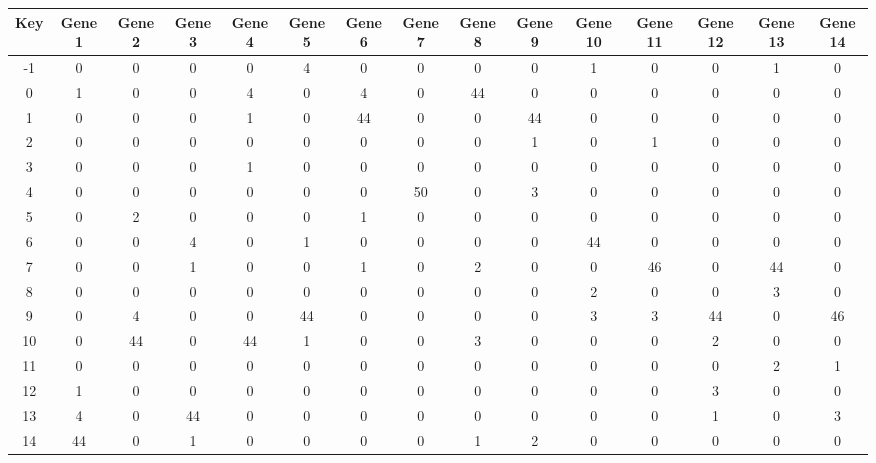 \begin{tabular}{|c|c|c|c|c|c|c|c|c|c|c|c|c|c|c|}
\hline
Key & Gene 1 & Gene 2 & Gene 3 & Gene 4 & Gene 5 & Gene 6 & Gene 7 & Gene 8 & Gene 9 & Gene 10 & Gene 11 & Gene 12 & Gene 13 & Gene 14 \\
\hline
-1 & 0 & 0 & 0 & 0 & 4 & 0 & 0 & 0 & 0 & 1 & 0 & 0 & 1 & 0 \\
0 & 1 & 0 & 0 & 4 & 0 & 4 & 0 & 44 & 0 & 0 & 0 & 0 & 0 & 0 \\
1 & 0 & 0 & 0 & 1 & 0 & 44 & 0 & 0 & 44 & 0 & 0 & 0 & 0 & 0 \\
2 & 0 & 0 & 0 & 0 & 0 & 0 & 0 & 0 & 1 & 0 & 1 & 0 & 0 & 0 \\
3 & 0 & 0 & 0 & 1 & 0 & 0 & 0 & 0 & 0 & 0 & 0 & 0 & 0 & 0 \\
4 & 0 & 0 & 0 & 0 & 0 & 0 & 50 & 0 & 3 & 0 & 0 & 0 & 0 & 0 \\
5 & 0 & 2 & 0 & 0 & 0 & 1 & 0 & 0 & 0 & 0 & 0 & 0 & 0 & 0 \\
6 & 0 & 0 & 4 & 0 & 1 & 0 & 0 & 0 & 0 & 44 & 0 & 0 & 0 & 0 \\
7 & 0 & 0 & 1 & 0 & 0 & 1 & 0 & 2 & 0 & 0 & 46 & 0 & 44 & 0 \\
8 & 0 & 0 & 0 & 0 & 0 & 0 & 0 & 0 & 0 & 2 & 0 & 0 & 3 & 0 \\
9 & 0 & 4 & 0 & 0 & 44 & 0 & 0 & 0 & 0 & 3 & 3 & 44 & 0 & 46 \\
10 & 0 & 44 & 0 & 44 & 1 & 0 & 0 & 3 & 0 & 0 & 0 & 2 & 0 & 0 \\
11 & 0 & 0 & 0 & 0 & 0 & 0 & 0 & 0 & 0 & 0 & 0 & 0 & 2 & 1 \\
12 & 1 & 0 & 0 & 0 & 0 & 0 & 0 & 0 & 0 & 0 & 0 & 3 & 0 & 0 \\
13 & 4 & 0 & 44 & 0 & 0 & 0 & 0 & 0 & 0 & 0 & 0 & 1 & 0 & 3 \\
14 & 44 & 0 & 1 & 0 & 0 & 0 & 0 & 1 & 2 & 0 & 0 & 0 & 0 & 0 \\
\hline
\end{tabular}